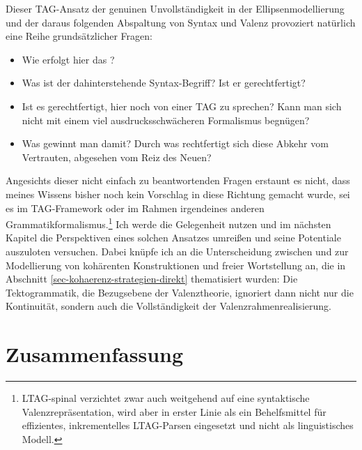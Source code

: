 Dieser TAG-Ansatz der genuinen Unvollständigkeit in der Ellipsenmodellierung und der daraus folgenden Abspaltung von Syntax und Valenz provoziert natürlich eine Reihe grundsätzlicher Fragen: 
\begin{itemize}
  \item Wie erfolgt hier das ?
  \item Was ist der dahinterstehende Syntax-Begriff? Ist er gerechtfertigt?
  \item Ist es gerechtfertigt, hier noch von einer TAG zu sprechen? Kann man sich nicht mit einem viel ausdrucksschwächeren Formalismus begnügen? 
  \item Was gewinnt man damit? Durch was rechtfertigt sich diese Abkehr vom Vertrauten, abgesehen vom Reiz des Neuen?
\end{itemize}
Angesichts dieser nicht einfach zu beantwortenden Fragen erstaunt es nicht, dass meines Wissens bisher noch kein Vorschlag in diese Richtung gemacht wurde, sei es im TAG-Framework oder im Rahmen irgendeines anderen Grammatikformalismus.\footnote{LTAG-spinal \citep{Shen:06,Shen:etal:08} verzichtet zwar auch weitgehend auf eine syntaktische Valenzrepräsentation, wird aber in erster Linie als ein Behelfsmittel für effizientes, inkrementelles LTAG-Parsen eingesetzt und nicht als linguistisches Modell.} Ich werde die Gelegenheit nutzen und im nächsten Kapitel die Perspektiven eines solchen Ansatzes umrei\ss en und seine Potentiale auszuloten versuchen. Dabei knüpfe ich an die Unterscheidung zwischen  und  zur Modellierung von kohärenten Konstruktionen und freier Wortstellung an, die in Abschnitt \ref{sec-kohaerenz-strategien-direkt} thematisiert wurden: Die Tektogrammatik, die Bezugsebene der Valenztheorie, ignoriert dann nicht nur die Kontinuität, sondern auch die Vollständigkeit der Valenzrahmenrealisierung.  



\section{Zusammenfassung}

